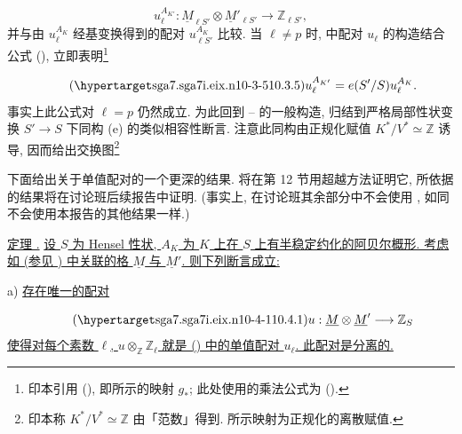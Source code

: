 \begin{equation*}
u_\ell^{A_{K'}}:
 \underline M_{\ell S'}\otimes\underline M'_{\ell S'}
 \longrightarrow\mathbb Z_{\ell S'},
\end{equation*}
并与由 $u_\ell^{A_K}$ 经基变换得到的配对 $u_{\ell S'}^{A_K}$ 比较. 当 $\ell\ne p$ 时,  中配对 $u_\ell$ 的构造结合公式 (), 立即表明\footnote{印本引用 (), 即所示的映射 $g_*$; 此处使用的乘法公式为 ().}

\begin{equation}\tag{\SGARefTarget{sga7.sga7i.eix.n10-3-5}{10.3.5}}
u_\ell^{A_{K'}}=e(S'/S)u_\ell^{A_K}.
\end{equation}
事实上此公式对 $\ell=p$ 仍然成立. 为此回到 -- 的一般构造, 归结到严格局部性状变换 $S'\longrightarrow S$ 下同构 (e) 的类似相容性断言. 注意此同构由正规化赋值 $K^*/V^*\simeq\mathbb Z$ 诱导, 因而给出交换图\footnote{印本称 $K^*/V^*\simeq\mathbb Z$ 由「范数」得到. 所示映射为正规化的离散赋值.}

\begin{center}
\end{center}

下面给出关于单值配对的一个更深的结果. 将在第 12 节用超越方法证明它, 所依据的结果将在讨论班后续报告中证明. (事实上, 在讨论班其余部分中不会使用 , 如同不会使用本报告的其他结果一样.)

\medskip
\noindent
\underline{定理 .} \underline{设 $S$ 为 Hensel 性状, $A_K$ 为 $K$ 上在 $S$ 上有半稳定约化的阿贝尔概形. 考虑如  (参见 ) 中关联的格 $\underline M$ 与 $\underline M'$. 则下列断言成立:}

\smallskip
\noindent
a) \underline{存在唯一的配对}

\begin{equation}\tag{\SGARefTarget{sga7.sga7i.eix.n10-4-1}{10.4.1}}
u:\underline M\otimes\underline M'\longrightarrow\mathbb Z_S
\end{equation}
\underline{使得对每个素数 $\ell$, $u\otimes_{\mathbb Z}\mathbb Z_\ell$ 就是 () 中的单值配对 $u_\ell$. 此配对是分离的.}

